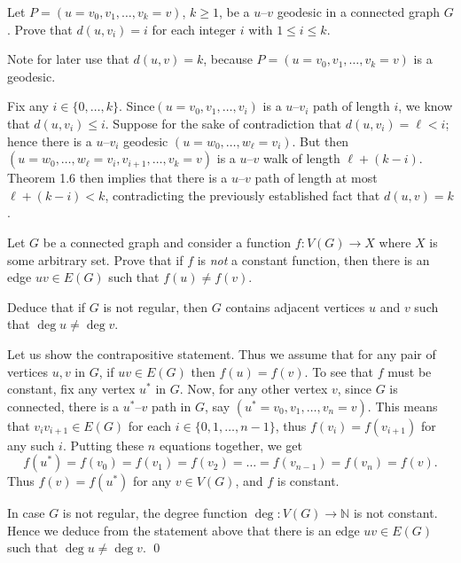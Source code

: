 \documentclass[11pt,answers]{exam}
\theoremstyle{definition}
\begin{document}
\begin{questions}
	
	\question[25] 
Let $P=(u=v_0,v_1,\ldots,v_k=v)$, $k\geq 1$, be a $u$--$v$ geodesic in a connected graph $G$. 
Prove that $d(u,v_i)=i$ for each integer $i$ with $1\leq i\leq k$.
\begin{solution}
	Note for later use that $d(u,v)=k$, because $P=(u=v_0,v_1,\ldots,v_k=v)$ is a  geodesic.
	
	Fix any $i\in\{0,\dots,k\}$. Since$(u=v_0,v_1,\dots,v_i)$ is a $u$--$v_i$ path of length $i$, we know that $d(u,v_i)\leq i$. Suppose for the sake of contradiction that  $d(u,v_i)=\ell< i$; hence there is a $u$--$v_i$ geodesic $(u = w_0,\dots,w_\ell = v_i)$. But then $(u = w_0,\dots,w_\ell = v_i, v_{i+1},\dots,v_k= v)$ is a $u$--$v$ walk of length $\ell+(k-i)$.  Theorem 1.6 then implies that there is a $u$--$v$ path of length at most $\ell+(k-i)<k$, contradicting the previously established fact that $d(u, v) = k$.
\end{solution}


\question [25] 	Let $G$ be a connected graph and consider a function $f\colon V(G)\to X$ where $X$ is some arbitrary set.
	Prove that if $f$ is \emph{not} a constant function, then there is an edge $uv\in E(G)$ such that $f(u)\neq f(v)$. 
	
	Deduce that if $G$ is not regular, then $G$ contains adjacent vertices $u$ and $v$ such that $\deg u\neq\deg v$.


\begin{solution}
	Let us show the contrapositive statement. Thus we assume that for any pair of vertices $u, v$ in $G$, if $uv\in E(G)$ then $f(u)=f(v)$. To see that $f$ must be constant, fix any vertex $u^*$ in $G$. Now, for any other vertex $v$, since $G$ is connected, there is a $u^*$--$v$ path in $G$, say $(u^*=v_0, v_1, \dots, v_n=v)$. This means that $v_i v_{i+1} \in E(G)$ for each $i\in\{0, 1, \dots, n-1\}$, thus $f(v_i)=f(v_{i+1})$ for any such $i$. Putting these $n$ equations together, we get
	\[f(u^*)=f(v_0)=f(v_1)=f(v_2)=\dots=f(v_{n-1})=f(v_n)=f(v).\] 
	Thus $f(v)=f(u^*)$ for any $v\in V(G)$, and $f$ is constant. 
	
	In case $G$ is not regular, the degree function $\deg \colon V(G) \to \mathbb N$ is not constant. Hence we deduce from the statement above that there is an edge $uv\in E(G)$ such that $\deg u \ne \deg v$.
	\qed
\end{solution}




\end{questions}
\end{document}
